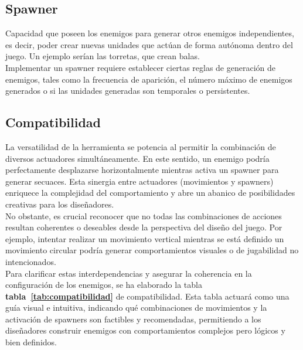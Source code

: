 \subsection{Spawner}
Capacidad que poseen los enemigos para generar otros enemigos independientes, es decir, poder crear nuevas unidades que actúan de forma autónoma dentro del juego. Un ejemplo serían las torretas, que crean balas.\\
Implementar un spawner requiere establecer ciertas reglas de generación de enemigos, tales como la frecuencia de aparición, el número máximo de enemigos generados o si las unidades generadas son temporales o persistentes.
\subsection{Compatibilidad}
La versatilidad de la herramienta se potencia al permitir la combinación de diversos actuadores simultáneamente. En este sentido, un enemigo podría perfectamente desplazarse horizontalmente mientras activa un spawner para generar secuaces. Esta sinergia entre actuadores (movimientos y spawners) enriquece la complejidad del comportamiento y abre un abanico de posibilidades creativas para los diseñadores.\\
No obstante, es crucial reconocer que no todas las combinaciones de acciones resultan coherentes o deseables desde la perspectiva del diseño del juego. Por ejemplo, intentar realizar un movimiento vertical mientras se está definido un movimiento circular podría generar comportamientos visuales o de jugabilidad no intencionados. \\
Para clarificar estas interdependencias y asegurar la coherencia en la configuración de los enemigos, se ha elaborado la tabla \textbf{tabla~\ref{tab:compatibilidad}} de compatibilidad. Esta tabla actuará como una guía visual e intuitiva, indicando qué combinaciones de movimientos y la activación de spawners son factibles y recomendadas, permitiendo a los diseñadores construir enemigos con comportamientos complejos pero lógicos y bien definidos.

